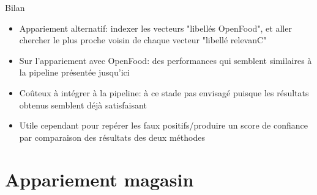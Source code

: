 \documentclass[ignorenonframetext,]{beamer}
\begin{document}
\begin{frame}{Bilan}
    \begin{itemize}
    \item Appariement alternatif: indexer les vecteurs "libellés OpenFood", et aller chercher le plus proche voisin de chaque vecteur "libellé relevanC"
        \item Sur l'appariement avec OpenFood: des performances qui semblent similaires à la pipeline présentée jusqu'ici
        \item Coûteux à intégrer à la pipeline: à ce stade pas envisagé puisque les résultats obtenus semblent déjà satisfaisant
        \item Utile cependant pour repérer les faux positifs/produire un score de confiance par comparaison des résultats des deux méthodes
    \end{itemize}
\end{frame}
\section{Appariement magasin}\label{sec: appariement magasin}
\end{document}
